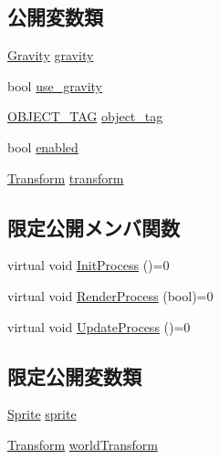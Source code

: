 \subsection*{公開変数類}
\begin{DoxyCompactItemize}
\item 
\mbox{\hyperlink{class_gravity}{Gravity}} \mbox{\hyperlink{class_object_base_a570bfa03730e906989187bfbcad95c51}{gravity}}
\item 
bool \mbox{\hyperlink{class_object_base_aab135a2a04e76046804f01b63df4f35c}{use\+\_\+gravity}}
\item 
\mbox{\hyperlink{object__base_8h_a0eff9883ab049ee02773dde19d057c0c}{O\+B\+J\+E\+C\+T\+\_\+\+T\+AG}} \mbox{\hyperlink{class_object_base_aff7eb5482ca9bc1cd30b84994d0dad8b}{object\+\_\+tag}}
\item 
bool \mbox{\hyperlink{class_object_base_ade1c868f20653a6fa5236544120eca2b}{enabled}}
\item 
\mbox{\hyperlink{class_transform}{Transform}} \mbox{\hyperlink{class_object_base_ac8096c26fe09682da6119208d392dc62}{transform}}
\end{DoxyCompactItemize}
\subsection*{限定公開メンバ関数}
\begin{DoxyCompactItemize}
\item 
virtual void \mbox{\hyperlink{class_object_base_af133f36f2bca1dcfd962e2cfac61ab51}{Init\+Process}} ()=0
\item 
virtual void \mbox{\hyperlink{class_object_base_aeac51d868beeb7f7fe900407b76b93a2}{Render\+Process}} (bool)=0
\item 
virtual void \mbox{\hyperlink{class_object_base_a8b5b72b363a419767efde0b0e692ea95}{Update\+Process}} ()=0
\end{DoxyCompactItemize}
\subsection*{限定公開変数類}
\begin{DoxyCompactItemize}
\item 
\mbox{\hyperlink{class_sprite}{Sprite}} \mbox{\hyperlink{class_object_base_a16415e349623e10f45518fb637f7051b}{sprite}}
\item 
\mbox{\hyperlink{class_transform}{Transform}} \mbox{\hyperlink{class_object_base_abedc2ea4baa694611f8822ea6e04b210}{world\+Transform}}
\end{DoxyCompactItemize}


